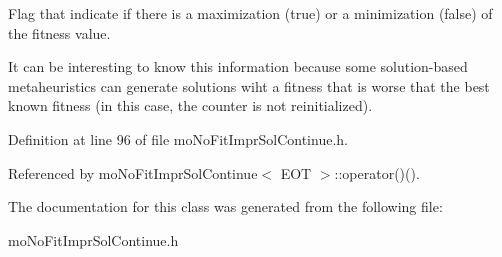 Flag that indicate if there is a maximization (true) or a minimization (false) of the fitness value. 

It can be interesting to know this information because some solution-based metaheuristics can generate solutions wiht a fitness that is worse that the best known fitness (in this case, the counter is not reinitialized). 

Definition at line 96 of file moNoFitImprSolContinue.h.

Referenced by moNoFitImprSolContinue$<$ EOT $>$::operator()().

The documentation for this class was generated from the following file:\begin{CompactItemize}
\item 
moNoFitImprSolContinue.h\end{CompactItemize}
